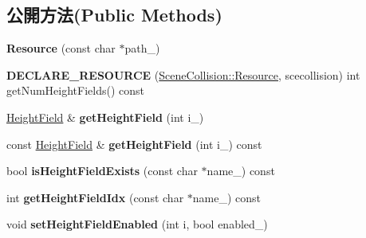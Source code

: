 \subsection*{公開方法(Public Methods)}
\begin{DoxyCompactItemize}
\item 
{\bfseries Resource} (const char $\ast$path\+\_\+)\hypertarget{class_magnum_1_1_scene_collision_1_1_resource_aebf0b98b54b423e862d03b2fda8ca6aa}{}\label{class_magnum_1_1_scene_collision_1_1_resource_aebf0b98b54b423e862d03b2fda8ca6aa}

\item 
{\bfseries D\+E\+C\+L\+A\+R\+E\+\_\+\+R\+E\+S\+O\+U\+R\+CE} (\hyperlink{class_magnum_1_1_scene_collision_1_1_resource}{Scene\+Collision\+::\+Resource}, scecollision) int get\+Num\+Height\+Fields() const \hypertarget{class_magnum_1_1_scene_collision_1_1_resource_a0750944158f787c77ad4029ef884dbe4}{}\label{class_magnum_1_1_scene_collision_1_1_resource_a0750944158f787c77ad4029ef884dbe4}

\item 
\hyperlink{class_magnum_1_1_scene_collision_1_1_height_field}{Height\+Field} \& {\bfseries get\+Height\+Field} (int i\+\_\+)\hypertarget{class_magnum_1_1_scene_collision_1_1_resource_ae3861835ef7e18d43529bf190373f02e}{}\label{class_magnum_1_1_scene_collision_1_1_resource_ae3861835ef7e18d43529bf190373f02e}

\item 
const \hyperlink{class_magnum_1_1_scene_collision_1_1_height_field}{Height\+Field} \& {\bfseries get\+Height\+Field} (int i\+\_\+) const \hypertarget{class_magnum_1_1_scene_collision_1_1_resource_ace74af3ca8766b2112784db0c7e89865}{}\label{class_magnum_1_1_scene_collision_1_1_resource_ace74af3ca8766b2112784db0c7e89865}

\item 
bool {\bfseries is\+Height\+Field\+Exists} (const char $\ast$name\+\_\+) const \hypertarget{class_magnum_1_1_scene_collision_1_1_resource_a04d9c656b6ddd3001e5fe6571ce2fc4d}{}\label{class_magnum_1_1_scene_collision_1_1_resource_a04d9c656b6ddd3001e5fe6571ce2fc4d}

\item 
int {\bfseries get\+Height\+Field\+Idx} (const char $\ast$name\+\_\+) const \hypertarget{class_magnum_1_1_scene_collision_1_1_resource_acd6640579c2bb50e8f31e51bef3af8e6}{}\label{class_magnum_1_1_scene_collision_1_1_resource_acd6640579c2bb50e8f31e51bef3af8e6}

\item 
void {\bfseries set\+Height\+Field\+Enabled} (int i, bool enabled\+\_\+)\hypertarget{class_magnum_1_1_scene_collision_1_1_resource_aa036cde4e5e14a129eba814183d1739c}{}\label{class_magnum_1_1_scene_collision_1_1_resource_aa036cde4e5e14a129eba814183d1739c}


\end{DoxyCompactItemize}

